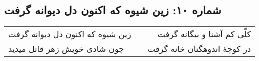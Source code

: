 \begin{center}
\section*{شماره ۱۰: زین شیوه که اکنون دل دیوانه گرفت}
\label{sec:010}
\begin{longtable}{l p{0.5cm} r}
زین شیوه که اکنون دل دیوانه گرفت
&&
کلّی کم آشنا و بیگانه گرفت
\\
چون شادی خویش زهر قاتل میدید
&&
در کوچهٔ اندوهگنان خانه گرفت
\\
\end{longtable}
\end{center}
